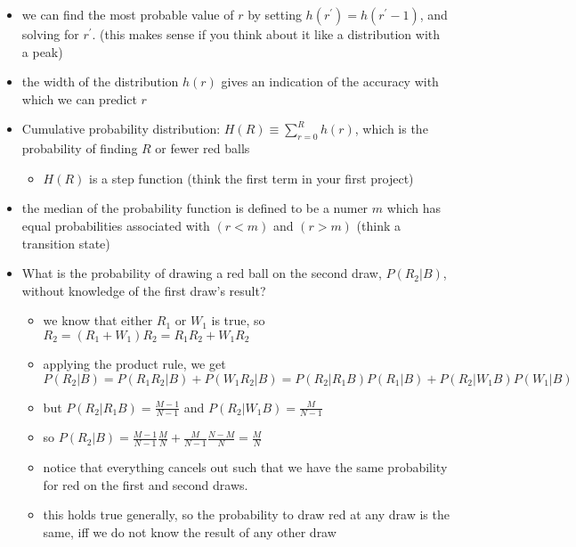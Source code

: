 \documentclass[../jaynes_prob_theory_notes.tex]{subfiles}
\begin{document}
\begin{itemize}
            \item we can find the most probable value of $r$ by setting $h(r^{\prime}) = h(r^{\prime} - 1)$, and solving for $r^{\prime}$. (this makes sense if you think about it like a distribution with a peak)
            \item the width of the distribution $h(r)$ gives an indication of the accuracy with which we can predict $r$
            \item Cumulative probability distribution: $H(R) \equiv \sum^{R}_{r=0}h(r)$, which is the probability of finding $R$ or fewer red balls
                \begin{itemize}
                    \item $H(R)$ is a step function (think the first term in your first project)
                \end{itemize}
            \item the median of the probability function is defined to be a numer $m$ which has equal probabilities associated with $(r < m)$ and $(r > m)$ (think a transition state)
        
            \item What is the probability of drawing a red ball on the second draw, $P(R_2|B)$, without knowledge of the first draw's result?
                \begin{itemize}
                    \item we know that either $R_1$ or $W_1$ is true, so $R_2 = (R_1 + W_1)R_2 = R_1R_2 + W_1R_2$
                    \item applying the product rule, we get 
                        \begin{equation*}
                        P(R_2|B) = P(R_1R_2|B) + P(W_1R_2|B) = P(R_2|R_1B)P(R_1|B) + P(R_2|W_1B)P(W_1|B)
                        \end{equation*}
                    \item but $P(R_2|R_1B) = \frac{M-1}{N-1}$ and $P(R_2|W_1B) = \frac{M}{N-1}$
                    \item so $P(R_2|B) = \frac{M-1}{N-1}\frac{M}{N} + \frac{M}{N-1}\frac{N-M}{N} = \frac{M}{N}$
                    \item notice that everything cancels out such that we have the same probability for red on the first and second draws.
                    \item this holds true generally, so the probability to draw red at any draw is the same, iff we do not know the result of any other draw
                \end{itemize}
        \end{itemize}
\end{document}
